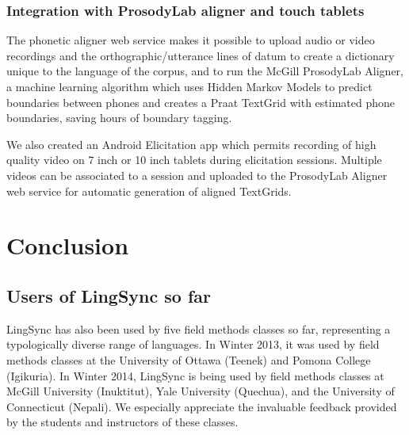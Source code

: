 \documentclass[letterpaper, 12pt, dvips]{mitwpl}
\begin{document}
\subsubsection{Integration with ProsodyLab aligner and touch tablets}
\label{sec:phoneticwebservice}

The phonetic aligner web service makes it possible to upload audio or video recordings and the orthographic/utterance lines of datum to create a dictionary unique to the language of the corpus,
and to run the McGill ProsodyLab Aligner,
a machine learning algorithm which uses Hidden Markov Models to predict boundaries between phones and creates a Praat TextGrid with estimated phone boundaries,
saving hours of boundary tagging.


We also created an Android Elicitation app which permits recording of high quality video on 7 inch or 10 inch tablets during elicitation sessions.
Multiple videos can be associated to a session and uploaded to the ProsodyLab Aligner web service for automatic generation of aligned TextGrids. 

%




\section{Conclusion } 
\label{sec:conclusion}

\subsection{Users of LingSync so far}
\label{sec:use}

LingSync has also been used by five field methods classes so far, representing a typologically diverse range of languages.  In Winter 2013, it was used by field methods classes 
at the University of Ottawa (Teenek) and Pomona College  (Igikuria). In Winter 2014, LingSync is being used by field methods classes
at McGill University (Inuktitut),
Yale University (Quechua),
and the University of Connecticut (Nepali).
We especially appreciate the invaluable feedback provided by the students and instructors of these classes.
\end{document}
